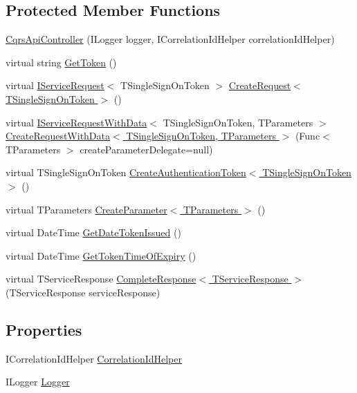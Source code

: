 \subsection*{Protected Member Functions}
\begin{DoxyCompactItemize}
\item 
\hyperlink{classCqrs_1_1WebApi_1_1CqrsApiController_a83125cca7cbb61ac890d3a4115db2bdf}{Cqrs\+Api\+Controller} (I\+Logger logger, I\+Correlation\+Id\+Helper correlation\+Id\+Helper)
\item 
virtual string \hyperlink{classCqrs_1_1WebApi_1_1CqrsApiController_ab60b18a6ae594ed4691713c00264e1ee}{Get\+Token} ()
\item 
virtual \hyperlink{interfaceCqrs_1_1Services_1_1IServiceRequest}{I\+Service\+Request}$<$ T\+Single\+Sign\+On\+Token $>$ \hyperlink{classCqrs_1_1WebApi_1_1CqrsApiController_ad24653d9e31cfb74e7cda44a70ad022e}{Create\+Request$<$ T\+Single\+Sign\+On\+Token $>$} ()
\item 
virtual \hyperlink{interfaceCqrs_1_1Services_1_1IServiceRequestWithData}{I\+Service\+Request\+With\+Data}$<$ T\+Single\+Sign\+On\+Token, T\+Parameters $>$ \hyperlink{classCqrs_1_1WebApi_1_1CqrsApiController_a3fe6d3685d8dff1e44d0310540527b0e}{Create\+Request\+With\+Data$<$ T\+Single\+Sign\+On\+Token, T\+Parameters $>$} (Func$<$ T\+Parameters $>$ create\+Parameter\+Delegate=null)
\item 
virtual T\+Single\+Sign\+On\+Token \hyperlink{classCqrs_1_1WebApi_1_1CqrsApiController_af27a5ca72991c6fd2e50907cb032dd2b}{Create\+Authentication\+Token$<$ T\+Single\+Sign\+On\+Token $>$} ()
\item 
virtual T\+Parameters \hyperlink{classCqrs_1_1WebApi_1_1CqrsApiController_a157e6f8a2f1ec94decfc8c96f74962a2}{Create\+Parameter$<$ T\+Parameters $>$} ()
\item 
virtual Date\+Time \hyperlink{classCqrs_1_1WebApi_1_1CqrsApiController_abc17886f0ecd2a44d487ed88766ee174}{Get\+Date\+Token\+Issued} ()
\item 
virtual Date\+Time \hyperlink{classCqrs_1_1WebApi_1_1CqrsApiController_a382c452313c3492ef7c73865e03902b2}{Get\+Token\+Time\+Of\+Expiry} ()
\item 
virtual T\+Service\+Response \hyperlink{classCqrs_1_1WebApi_1_1CqrsApiController_add369c5b7779bc8d69c47bcc564ac086}{Complete\+Response$<$ T\+Service\+Response $>$} (T\+Service\+Response service\+Response)
\end{DoxyCompactItemize}
\subsection*{Properties}
\begin{DoxyCompactItemize}
\item 
I\+Correlation\+Id\+Helper \hyperlink{classCqrs_1_1WebApi_1_1CqrsApiController_a146cfce225b189571b5f13b47e37b595}{Correlation\+Id\+Helper}
\item 
I\+Logger \hyperlink{classCqrs_1_1WebApi_1_1CqrsApiController_ae5536cab68a0c000aff82036820956d8}{Logger}
\end{DoxyCompactItemize}


